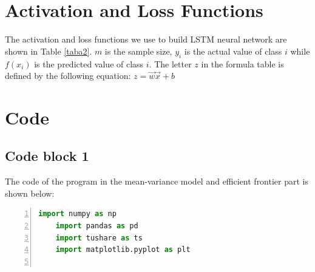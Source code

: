 \documentclass[default,iicol]{sn-jnl}%
\begin{document}
\begin{appendices}
\section{Activation and Loss Functions}\label{secA2}
The activation and loss functions we use to build LSTM neural network are shown in Table \ref{taba2}. $m$ is the sample size, $y_{i}$ is the actual value of class $i$ while $f(x_{i})$ is the predicted value of class $i$. The letter $z$ in the formula table is defined by the following equation: $z=\overrightarrow{w}\overrightarrow{x} +b$
\begin{table}[htbp]
	\renewcommand{\arraystretch}{2}
	\centering
	\caption{Activation and loss functions for training networks. $\eta$ is the number of samples, $K$ is total number of classes, $\beta_i$ is the weight for class $i$, $y_i$ is the actual value for class $i$, and $\hat{y}_i$ is the prediction value for class $i$.}
	\label{taba2}
\end{table}
\clearpage

\section{Code}\label{secA3}
\subsection{Code block 1}\label{SecA3sub1}
The code of the program in the mean-variance model and efficient frontier part is shown below:
\begin{lstlisting}[language=Python,numbers=left, 
	numberstyle= \tiny, 
	keywordstyle= \color{ blue!70},
	commentstyle= \color{red!50!green!50!blue!50}, 
	frame=shadowbox, % 阴影效果
	rulesepcolor= \color{ red!20!green!20!blue!20} ,
	escapeinside=``, % 英文分号中可写入中文
	xleftmargin=2em,xrightmargin=2em, aboveskip=1em,
	framexleftmargin=2em]
	import numpy as np
	import pandas as pd
	import tushare as ts
	import matplotlib.pyplot as plt
	

\end{lstlisting}
\end{appendices}
\end{document}

